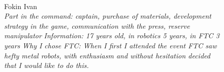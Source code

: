 \begin{figure}[H]
	\begin{minipage}[h]{0.47\linewidth}
		\\
		Fokin Ivan\\
		\emph{Part in the command: captain,   purchase of materials,  development strategy in the game,  communication with the press, reserve  manipulator }
		\emph{Information: 17 years old, in robotics 5 years, in FTC 3 years } 
		\emph{Why I chose FTC: When I first I attended the event FTC saw hefty metal robots, with enthusiasm and without hesitation decided that I would like to do this.}
	\end{minipage}
	\hfill
	\begin{minipage}[h]{0.47\linewidth}

\end{minipage}
\end{figure}

